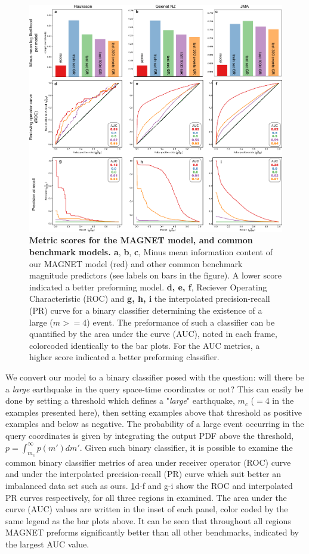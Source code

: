 \documentclass[pdflatex]{sn-jnl}
\begin{document}
\begin{figure}[h!]
    \centering
    \includegraphics[width=1\textwidth]{figures/combined_batplots.pdf}
    \caption{
        \textbf{Metric scores for the MAGNET model, and common benchmark models. a}, \textbf{b}, \textbf{c}, Minus mean information content of our MAGNET model (red) and other common benchmark magnitude predictors (see labels on bars in the figure). A lower score indicated a better preforming model. \textbf{d, e, f}, Reciever Operating Characteristic (ROC) and \textbf{g, h, i} the interpolated precision-recall (PR) curve for a binary classifier determining the existence of a large ($m>=4$) event. The preformance of such a classifier can be quantified by the area under the curve (AUC), noted in each frame, colorcoded identically to the bar plots. For the AUC metrics, a higher score indicated a better preforming classifier.
        }
        \label{fig:metrics}
\end{figure}

We convert our model to a binary classifier posed with the question: will there be a \textit{large} earthquake in the query space-time coordinates or not? This can easily be done by setting a threshold which defines a "\textit{large}" earthquake, $m_c$ ($=4$ in the examples presented here), then setting examples above that threshold as positive examples and below as negative. The probability of a large event occurring in the query coordinates is given by integrating the output PDF above the threshold, $p=\int_{m_c}^{\infty}p(m')dm'$. Given such binary classifier, it is possible to examine the common binary classifier metrics of area under receiver operator (ROC) curve \cite{Murphy} and under the interpolated precision-recall (PR) curve \cite{buttcher_information_2010} which suit better an imbalanced data set such as ours. \ref{fig:metrics}d-f and g-i show the ROC and interpolated PR curves respectively, for all three regions in examined. The area under the curve (AUC) values are written in the inset of each panel, color coded by the same legend as the bar plots above. It can be seen that throughout all regions MAGNET preforms significantly better than all other benchmarks, indicated by the largest AUC value.
\end{document}
